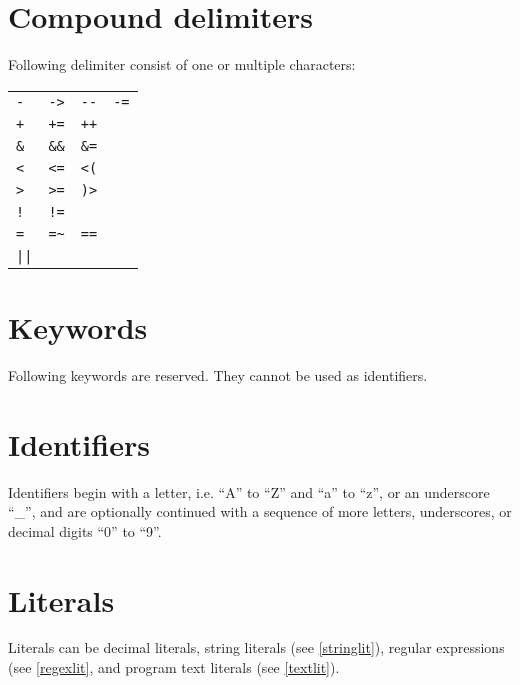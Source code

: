 \section{Compound delimiters}

Following delimiter consist of one or multiple characters:

\bigskip
\noindent
\begin{tabular}{l l l l}
   \lstinline!-! & \lstinline!->! & \lstinline!--! & \lstinline!-=! \\
   \lstinline!+! & \lstinline!+=! & \lstinline!++! \\
   \lstinline!&! & \lstinline!&&! & \lstinline!&=! \\
   \lstinline!<! & \lstinline!<=! & \lstinline!<(! \\
   \lstinline!>! & \lstinline!>=! & \lstinline!)>! \\
   \lstinline/!/ & \lstinline/!=/ \\
   \lstinline!=! & \lstinline!=~! & \lstinline!==! \\
   \lstinline!||! \\
\end{tabular}

\section{Keywords}

Following keywords are reserved. They cannot be used as identifiers.

\bigskip
\noindent


\section{Identifiers}\label{identifier}

Identifiers begin with a letter, i.e. ``A'' to ``Z'' and ``a'' to ``z'',
or an underscore ``\_'', and are optionally continued with a sequence
of more letters, underscores, or decimal digits ``0'' to ``9''.

\section{Literals}

Literals can be decimal literals, string literals (see \ref{stringlit}),
regular expressions (see \ref{regexlit}, and program text literals (see \ref{textlit}).

